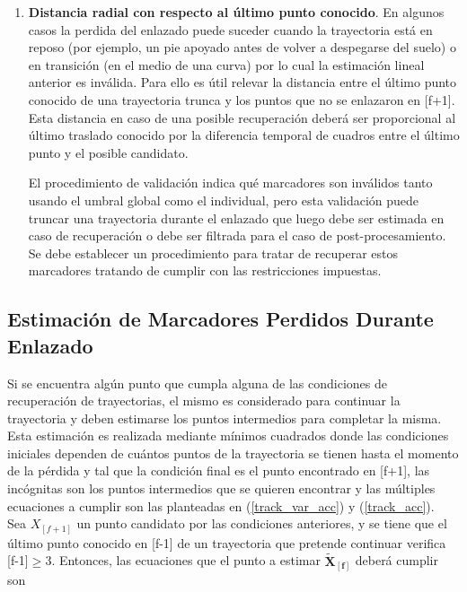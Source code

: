 \begin{itemize}
\begin{enumerate}
  \item \textbf{Distancia radial con respecto al último punto conocido}. En algunos casos la perdida del enlazado puede suceder cuando la trayectoria está en reposo (por ejemplo, un pie apoyado antes de volver a despegarse del suelo) o en transición (en el medio de una curva) por lo cual la estimación lineal anterior es inválida. Para ello es útil relevar la distancia entre el último punto conocido de una trayectoria trunca y los puntos que no se enlazaron en [f+1]. Esta distancia en caso de una posible recuperación deberá ser proporcional al último traslado conocido por la diferencia temporal de cuadros entre el último punto y el posible candidato.
 
El procedimiento de validación indica qué marcadores son inválidos tanto usando el umbral global como el individual, pero esta validación puede truncar una trayectoria durante el enlazado que luego debe ser estimada en caso de recuperación o debe ser filtrada para el caso de post-procesamiento. Se debe establecer un procedimiento para tratar de recuperar estos marcadores tratando de cumplir con las restricciones impuestas.
 
  
\end{enumerate} 

\end{itemize}

\subsection{Estimación de Marcadores Perdidos Durante Enlazado}

Si se encuentra algún punto que cumpla alguna de las condiciones de recuperación de trayectorias, el mismo es considerado para continuar la trayectoria y deben estimarse los puntos intermedios para completar la misma.
\\ 

Esta estimación es realizada mediante mínimos cuadrados donde las condiciones iniciales dependen de cuántos puntos de la trayectoria se tienen hasta el momento de la pérdida y tal que la condición final es el punto encontrado en [f+1], las incógnitas son los puntos intermedios que se quieren encontrar y las múltiples ecuaciones a cumplir son las planteadas en (\ref{track_var_acc}) y (\ref{track_acc}).
\\ 

Sea $X_{[f+1]}$ un punto candidato por las condiciones anteriores, y se tiene que el último punto conocido en [f-1] de un trayectoria que pretende continuar verifica [f-1]$\geq$3. Entonces, las ecuaciones que el punto a estimar $\boldsymbol{\tilde{X}_{[f]}}$ deberá cumplir son


